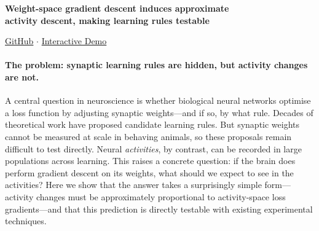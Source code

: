 \documentclass[10pt]{article}
\begin{document}
\begin{center}
{\Large\bfseries Weight-space gradient descent induces approximate\\ activity descent, making learning rules testable}
\end{center}
\vspace{-2pt}
\begin{center}
\small
\href{https://github.com/koerding/ADescent}{GitHub} $\cdot$
\href{https://koerding.github.io/ADescent/}{Interactive Demo}
\end{center}
\vspace{-2pt}

\small

\paragraph{The problem: synaptic learning rules are hidden, but activity changes are not.}
A central question in neuroscience is whether biological neural networks optimise a loss function by adjusting synaptic weights---and if so, by what rule.  Decades of theoretical work have proposed candidate learning rules.  But synaptic weights cannot be measured at scale in behaving animals, so these proposals remain difficult to test directly.  Neural \emph{activities}, by contrast, can be recorded in large populations across learning.  This raises a concrete question: if the brain does perform gradient descent on its weights, what should we expect to see in the activities?  Here we show that the answer takes a surprisingly simple form---activity changes must be approximately proportional to activity-space loss gradients---and that this prediction is directly testable with existing experimental techniques.
\end{document}
